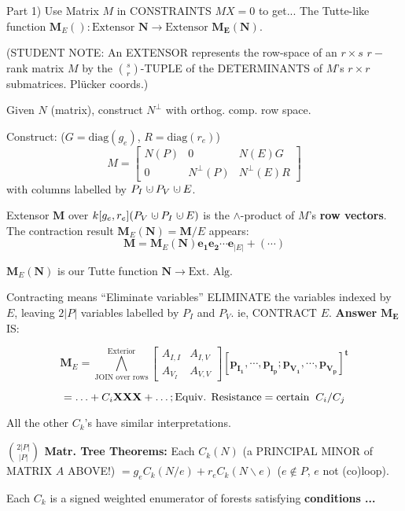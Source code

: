 \documentclass{beamer}
\newcommand{\dunion}
{\mbox{\hbox{\hskip0.45em$\cdot$\hskip-0.44em$\cup$\hskip0.2em}}}
\newcommand{\Remph}[1]{{\color{red}#1}}
\begin{document}
\begin{frame}
{Part 1) Use Matrix $M$ in CONSTRAINTS $MX=0$ to get...}
The Tutte-like function $\mathbf{M}_E():\text{Extensor }
\mathbf{N}\rightarrow\text{Extensor }\mathbf{M_E(N)}$.

{\small
(\Remph{STUDENT NOTE:} An EXTENSOR represents the row-space of an $r\times s$
$r-$rank matrix $M$ by the $\binom{s}{r}$-TUPLE of the DETERMINANTS of 
$M$'s $r\times r$ submatrices. \Remph{Pl\"{u}cker coords}.)
}

Given $N$ (matrix), construct $N^\perp$ 
with orthog. comp. row space.

Construct:  ($G=\mbox{diag}(g_e)$, $R=\mbox{diag}(r_e)$)
\[
M = \left[\begin{array}{c|c|c} N(P)  &  0  &  N(E)G \\  \hline
0  & N^{\perp}(P)  &  N^{\perp}(E)R \end{array}\right]
\]
with columns labelled by $P_I\dunion P_V\dunion E$.

Extensor $\mathbf{M}$ over $k[g_e, r_e](P_V\dunion P_I \dunion E)$
is the \Remph{$\wedge$-product} of $M$'s \textbf{row vectors}. The contraction result
$\mathbf{M}_E(\mathbf{N}) = \mathbf{M}/E$ appears:
\[
\mathbf{M} = \mathbf{M}_E(\mathbf{N})\mathbf{e_1}\mathbf{e_2}\cdots\mathbf{e}_{|E|} + (\cdots) 
\]

\Remph{
$\mathbf{M}_E(\mathbf{N})$ is our Tutte function $\mathbf{N}\rightarrow \text{Ext. Alg.}$}
\end{frame}


\begin{frame}{Contracting means ``Eliminate variables''}
ELIMINATE the variables indexed by $E$, leaving $2|P|$ variables
labelled by $P_I$ and $P_V$.  ie, CONTRACT $E$. \textbf{Answer} 
$\mathbf{M_E}$ IS:

\[
\mathbf{M}_E = \bigwedge^{\text{Exterior}}_{\text{JOIN over rows}} \left[\begin{array}{c|c} A_{I,I}  &  A_{I,V}   \\  \hline
    A_{V_I}  & A_{V,V} \end{array}\right] 
[\mathbf{p_{I_1}, \cdots, p_{I_p}; p_{V_1}, \cdots, p_{V_p}}]^{\mathbf{t}} 
\]

\[
 = \ldots + C_i\mbox{\bf XXX} + \ldots; \text{Equiv. Resistance} = 
\text{certain}\;\; C_i/C_j
\]

All the other $C_k$'s have similar interpretations.

{\bf $\binom{2|P|}{|P|}$ Matr. Tree Theorems:}
Each $C_k(N)$ (a PRINCIPAL MINOR of MATRIX \textbf{\Remph{$A$}} ABOVE!)
$= 
g_e C_k(N/e) + r_e C_k(N\backslash e)$ ($e\not\in P$, $e$ not (co)loop).

Each $C_k$ is a signed weighted enumerator of
forests satisfying \textbf{conditions ...}
\end{frame}
\end{document}
